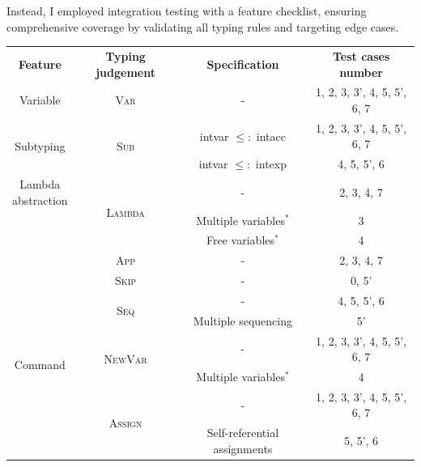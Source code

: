 \documentclass[12pt,a4paper]{report}
\theoremstyle{definition}
\begin{document}
    Instead, I employed integration testing with a feature checklist, ensuring comprehensive coverage by validating all typing rules and targeting edge cases.
    \begin{table}[H]
        \centering
        \begin{tabular}{| c | c | c | c |}
            \hline
            \textbf{Feature}  & \textbf{Typing judgement} & \textbf{Specification} & \textbf{Test cases number} \\
            \hhline{|=|=|=|=|}
            Variable & \textsc{Var} & - & 1, 2, 3, 3', 4, 5, 5', 6, 7 \\ \cline{3-4}
            \hline
            \multirow{2}{*}{Subtyping} 
                & \multirow{2}{*}{\textsc{Sub}} 
                    & \textsf{intvar} $\leq:$ \textsf{intacc} & 1, 2, 3, 3', 4, 5, 5', 6, 7  \\ \cline{3-4}
                &   & \textsf{intvar} $\leq:$ \textsf{intexp} & 4, 5, 5', 6 \\
            \hline
            \multirowcell{4}{Lambda\\abstraction} 
                & \multirow{3}{*}{\textsc{Lambda}} 
                    & - & 2, 3, 4, 7 \\ \cline{3-4}
                &   & Multiple variables\hyperlink{note1}{$^{\ast}$} & 3  \\ \cline{3-4}
                &   & Free variables\hyperlink{note1}{$^{\ast}$} & 4 \\ \cline{2-4}
                & \textsc{App} & - & 2, 3, 4, 7  \\
            \hline
            \multirow{7}{*}{Command} 
                & \textsc{Skip} & - & 0, 5' \\ \cline{2-4}
                & \multirow{2}{*}{\textsc{Seq}} 
                    & - & 4, 5, 5', 6 \\ \cline{3-4}
                &   & Multiple sequencing & 5' \\ \cline{2-4}
                & \multirow{2}{*}{\textsc{NewVar}} 
                    & - & 1, 2, 3, 3', 4, 5, 5', 6, 7 \\ \cline{3-4}
                &   & Multiple variables\hyperlink{note1}{$^{\ast}$} & 4 \\ \cline{2-4}
                & \multirow{2}{*}{\textsc{Assign}} 
                    & -  & 1, 2, 3, 3', 4, 5, 5', 6, 7  \\ \cline{3-4}
                &   & Self-referential assignments & 5, 5', 6 \\
            \hline

\end{tabular}
\end{table}
\end{document}

